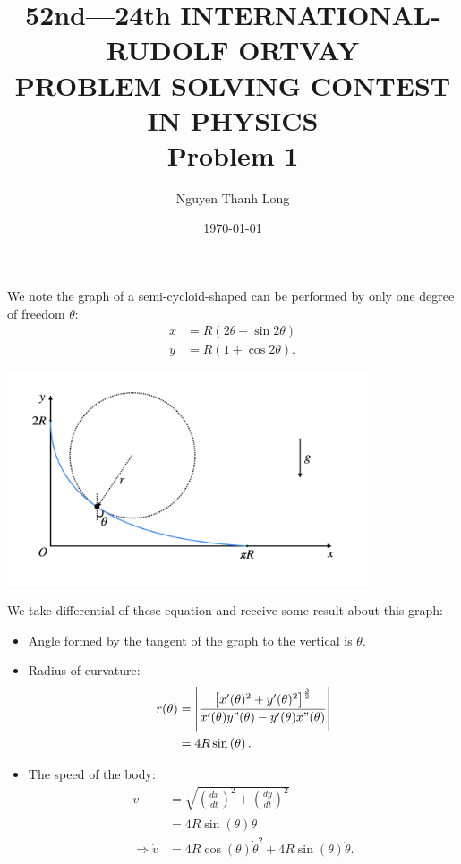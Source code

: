 \documentclass[12pt]{article}
\title{52nd—24th INTERNATIONAL-RUDOLF ORTVAY \\ PROBLEM SOLVING CONTEST IN PHYSICS \\ Problem 1}
\author{Nguyen Thanh Long}
\date{\today}
\begin{document}
	
\maketitle
	
\noindent We note the graph of a semi-cycloid-shaped can be performed by only one degree of freedom $\theta$:
\begin{align*}
	x & = R \left( 2 \theta - \sin 2 \theta \right) \\
	y & = R \left( 1 + \cos 2 \theta \right).
\end{align*}

\begin{center}
	\includegraphics[width=0.8\textwidth]{Fig P1.png}
\end{center}	

\noindent We take differential of these equation and receive some result about this graph:
\begin{itemize}
	\item Angle formed by the tangent of the graph to the vertical is $\theta$.
	\item Radius of curvature:
	\begin{align*}
		r(\theta) & = \left| \frac{ \left[ x'(\theta)^2 + y'(\theta)^2 \right]^{\frac{3}{2}}}{x'(\theta) y"(\theta) - y'(\theta) x"(\theta)} \right| \\
		& = 4 R \sin \left( \theta \right) . 
	\end{align*}
    \item The speed of the body:
    \begin{align*}
    	v & = \sqrt{ \left( \frac{dx}{dt} \right)^2 + \left( \frac{dy}{dt} \right)^2 } \\
    	& = 4 R \sin \left( \theta \right) \dot{\theta} \\
    	\Rightarrow \dot{v} & = 4 R \cos \left( \theta \right) \dot{\theta}^2 + 4 R \sin \left( \theta \right) \ddot{\theta} .
    \end{align*}	
\end{itemize}	
\end{document}
